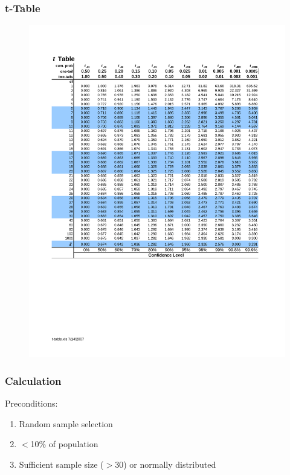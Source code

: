 \documentclass[12pt]{article}
\numberwithin{equation}{section}
\begin{document}
\subsubsection{t-Table}
\begin{figure}[!ht]
    \centering
    \includegraphics[width=\linewidth, clip, trim=2cm 8cm 2cm 2.5cm]{figures and tables/t-table.pdf}
    \label{fig:t_table}
\end{figure}
\vspace{-1cm}

\subsubsection{Calculation}
Preconditions:
\begin{enumerate}
    \item Random sample selection
    \item $<$10\% of population
    \item Sufficient sample size ($>$30) or normally distributed
\end{enumerate}
\end{document}
